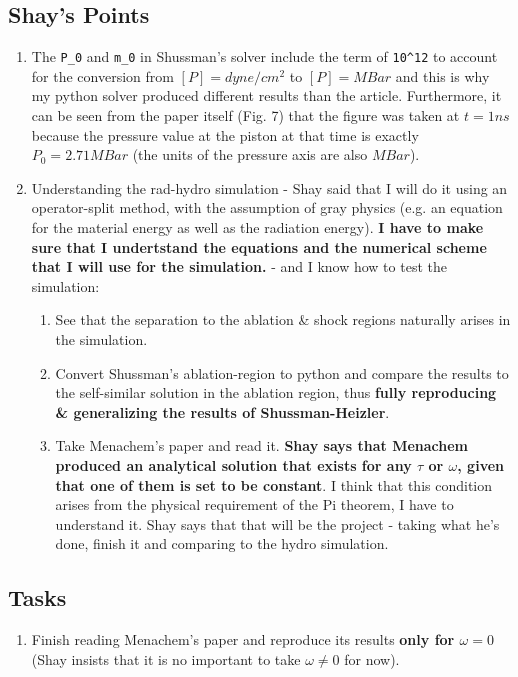 \documentclass[11pt]{article}
\begin{document}
\subsection{Shay's Points}
\begin{enumerate}
  \item The \texttt{P_0} and \texttt{m_0} in Shussman's solver include the term of \texttt{10^12} to account for the conversion from $[P] = dyne / cm^2$ to $[P] = MBar$ and this is why my python solver produced different results than the article. Furthermore, it can be seen from the paper itself (Fig. 7) that the figure was taken at $t=1ns$ because the pressure value at the piston at that time is exactly $P_0 = 2.71 MBar$ (the units of the pressure axis are also $MBar$).
  \item Understanding the rad-hydro simulation - Shay said that I will do it using an operator-split method, with the assumption of gray physics (e.g. an equation for the material energy as well as the radiation energy). \textbf{I have to make sure that I undertstand the equations and the numerical scheme that I will use for the simulation.} - and I know how to test the simulation:
  \begin{enumerate}
    \item See that the separation to the ablation \& shock regions naturally arises in the simulation.
    \item Convert Shussman's ablation-region to python and compare the results to the self-similar solution in the ablation region, thus \textbf{fully reproducing \& generalizing the results of Shussman-Heizler}.
    \item Take Menachem's paper and read it. \textbf{Shay says that Menachem produced an analytical solution that exists for any $\tau$ or $\omega$, given that one of them is set to be constant}. I think that this condition arises from the physical requirement of the Pi theorem, I have to understand it. Shay says that that will be the project - taking what he's done, finish it  and comparing to the hydro simulation.
  \end{enumerate}
\end{enumerate}
\subsection{Tasks}
\begin{enumerate}
  \item Finish reading Menachem's paper and reproduce its results \textbf{only for $\omega=0$} (Shay insists that it is no important to take $\omega \neq 0$ for now).
\end{enumerate}
\end{document}
